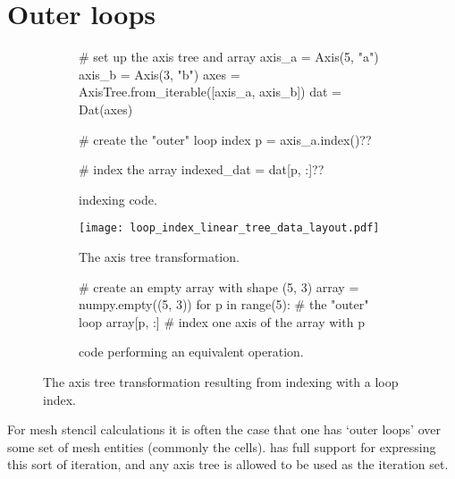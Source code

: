 \documentclass[thesis]{subfiles}
\begin{document}
\section{Outer loops}
\label{sec:outer_loops}

\begin{figure}
  \centering

  \begin{subfigure}{.9\textwidth}
    \begin{pyalg2}
      # set up the axis tree and array
      axis_a = Axis(5, "a")
      axis_b = Axis(3, "b")
      axes = AxisTree.from_iterable([axis_a, axis_b])
      dat = Dat(axes)

      # create the "outer" loop index
      p = axis_a.index()?\label{code:loop_index_init}?

      # index the array
      indexed_dat = dat[p, :]?\label{code:loop_index_apply}?
    \end{pyalg2}

    \caption{ indexing code.}
    \label{fig:loop_index_code}
  \end{subfigure}

  \vspace{1em}

  \begin{subfigure}{\textwidth}
    \centering
    \texttt{[image: loop\_index\_linear\_tree\_data\_layout.pdf]}
    \caption{
      The axis tree transformation.
    }
    \label{fig:loop_index_linear_tree_data_layout}
  \end{subfigure}

  \vspace{1em}

  \begin{subfigure}{.9\textwidth}
    \begin{pyalg2}
      # create an empty array with shape (5, 3)
      array = numpy.empty((5, 3))
      for p in range(5):           # the "outer" loop
        array[p, :]                # index one axis of the array with p
    \end{pyalg2}
    \caption{\numpy{} code performing an equivalent operation.}
    \label{fig:loop_index_numpy}
  \end{subfigure}
  \caption{
    The axis tree transformation resulting from indexing with a loop index.
  }
  \label{fig:loop_index_linear_tree_data_layout_all}
\end{figure}

For mesh stencil calculations it is often the case that one has `outer loops' over some set of mesh entities (commonly the cells).
 has full support for expressing this sort of iteration, and any axis tree is allowed to be used as the iteration set.
\end{document}
